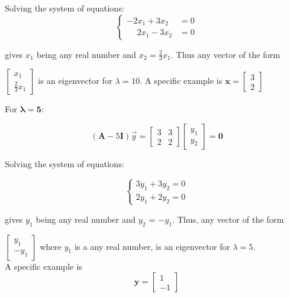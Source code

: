 \documentclass[14pt]{article}
\begin{document}
Solving the system of equations:
    \begin{equation}
        \begin{cases}
          -2x_1 + 3x_2 &= 0 \\
          \phantom{-}2x_1 - 3x_2 &= 0
        \end{cases}
    \end{equation}

gives $x_1$ being any real number and $x_2 = \frac{2}{3}x_1$. Thus any vector of the form
    
    $\left[\begin{array}{r}
             x_1  \\
              \frac{2}{3}x_1
           \end{array}\right]$ is an eigenvector for $\lambda = 10$.  
A specific example is $\mathbf{x} = \left[\begin{array}{l}
                        3  \\
                        2 
                       \end{array}\right]$
    
\vspace{2\baselineskip}
\begin{flushleft}
For $\boldsymbol{\lambda = 5}$:
\end{flushleft}
    $$
    (\mathbf{A} - 5\mathbf{I})\vec{y} = \left[\begin{array}{ll}
        3 & 3  \\
        2 & 2 
    \end{array}\right] \begin{bmatrix}
        y_1 \\
        y_2
    \end{bmatrix} = \mathbf{0}
    $$

Solving the system of equations:

    $$
        \begin{cases}
          3y_1 + 3y_2 = 0 \\
          2y_1 + 2y_2 = 0
        \end{cases}
    $$

    gives $y_1$ being any real number and $y_2$ = $- y_1$. Thus, any vector of the form 

    $\left[\begin{array}{r}
    y_1  \\
    - y_1
    \end{array}\right]$ where $y_1$ is a any real number, is an eigenvector for $\lambda = 5$.\\ 
    
    A specific example is  $$ \mathbf{y} = \left[\begin{array}{r}
                                            1  \\
                                            -1 
                                \end{array}\right]
                            $$
\end{document}
